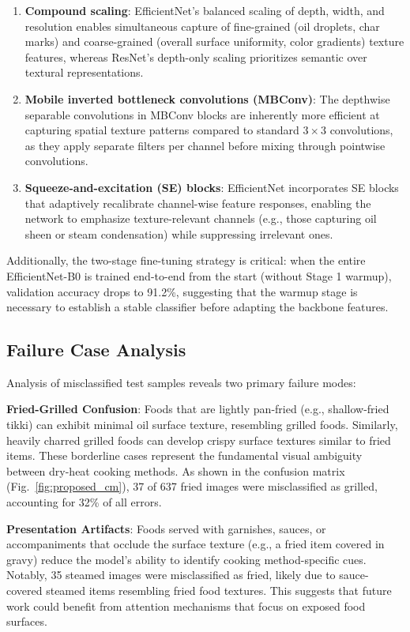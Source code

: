 \documentclass[journal]{IEEEtran}
\begin{document}
\begin{enumerate}
    \item \textbf{Compound scaling}: EfficientNet's balanced scaling of depth, width, and resolution enables simultaneous capture of fine-grained (oil droplets, char marks) and coarse-grained (overall surface uniformity, color gradients) texture features, whereas ResNet's depth-only scaling prioritizes semantic over textural representations.
    \item \textbf{Mobile inverted bottleneck convolutions (MBConv)}: The depthwise separable convolutions in MBConv blocks are inherently more efficient at capturing spatial texture patterns compared to standard $3 \times 3$ convolutions, as they apply separate filters per channel before mixing through pointwise convolutions.
    \item \textbf{Squeeze-and-excitation (SE) blocks}: EfficientNet incorporates SE blocks that adaptively recalibrate channel-wise feature responses, enabling the network to emphasize texture-relevant channels (e.g., those capturing oil sheen or steam condensation) while suppressing irrelevant ones.
\end{enumerate}

Additionally, the two-stage fine-tuning strategy is critical: when the entire EfficientNet-B0 is trained end-to-end from the start (without Stage 1 warmup), validation accuracy drops to 91.2\%, suggesting that the warmup stage is necessary to establish a stable classifier before adapting the backbone features.

\subsection{Failure Case Analysis}

Analysis of misclassified test samples reveals two primary failure modes:

\textbf{Fried-Grilled Confusion}: Foods that are lightly pan-fried (e.g., shallow-fried tikki) can exhibit minimal oil surface texture, resembling grilled foods. Similarly, heavily charred grilled foods can develop crispy surface textures similar to fried items. These borderline cases represent the fundamental visual ambiguity between dry-heat cooking methods. As shown in the confusion matrix (Fig.~\ref{fig:proposed_cm}), 37 of 637 fried images were misclassified as grilled, accounting for 32\% of all errors.

\textbf{Presentation Artifacts}: Foods served with garnishes, sauces, or accompaniments that occlude the surface texture (e.g., a fried item covered in gravy) reduce the model's ability to identify cooking method-specific cues. Notably, 35 steamed images were misclassified as fried, likely due to sauce-covered steamed items resembling fried food textures. This suggests that future work could benefit from attention mechanisms that focus on exposed food surfaces.
\end{document}
